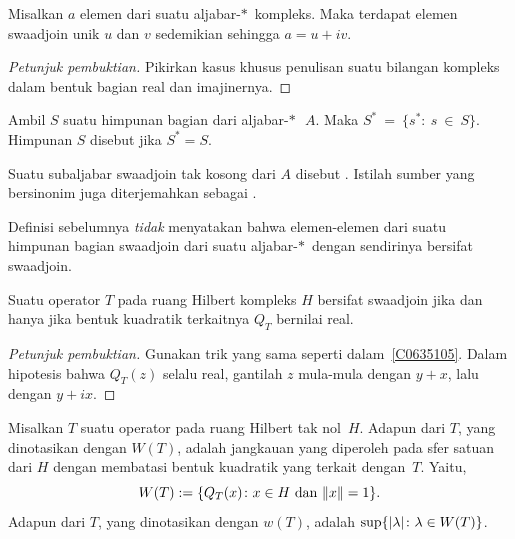 \begin{prop}\label{001093} Misalkan $a$ elemen dari suatu aljabar-$*\,$ kompleks.  Maka terdapat
elemen swaadjoin unik $u$ dan $v$ sedemikian sehingga $a = u + iv$.
\end{prop}

\begin{proof}[\emph{Petunjuk pembuktian}] Pikirkan kasus khusus penulisan suatu bilangan kompleks
dalam bentuk bagian real dan imajinernya.  \ns
\end{proof}

\begin{defn} Ambil $S$ suatu himpunan bagian dari aljabar-$*\,$~$A$.  Maka
$S^*~=~\{s^*\colon~s~\in~S\}$. Himpunan $S$ disebut
 jika $S^* = S$.

Suatu subaljabar swaadjoin tak kosong dari $A$ disebut
. Istilah sumber yang bersinonim juga diterjemahkan sebagai .
\end{defn}

\begin{cau} Definisi sebelumnya \emph{tidak} menyatakan bahwa elemen-elemen dari suatu
himpunan bagian swaadjoin dari suatu aljabar-$*\,$ dengan sendirinya bersifat swaadjoin.
\end{cau}

 \begin{prop} Suatu operator $T$ pada ruang Hilbert kompleks $H$ bersifat swaadjoin jika dan hanya jika
 bentuk kuadratik terkaitnya $Q_T$ bernilai real.
 \end{prop}

\begin{proof}[\emph{Petunjuk pembuktian}] Gunakan trik yang sama seperti dalam~\ref{C0635105}.  Dalam hipotesis bahwa
$Q_T(z)$ selalu real, gantilah $z$ mula-mula dengan $y + x$, lalu dengan $y + ix$.   \ns
\end{proof}

\begin{defn} Misalkan $T$ suatu operator pada ruang Hilbert tak nol~$H$.  Adapun
 dari $T$, yang dinotasikan dengan $W(T)$, adalah jangkauan yang diperoleh pada sfer satuan dari $H$
dengan membatasi bentuk kuadratik yang terkait dengan~$T$. Yaitu,
   \[ W(T) := \{Q_T(x) \colon x \in H \text{ dan } \lVert x\rVert = 1\}. \]
Adapun
 dari $T$, yang dinotasikan dengan $w(T)$, adalah $\sup\{\lvert\lambda\rvert\colon \lambda \in W(T)\}$.
\end{defn}

